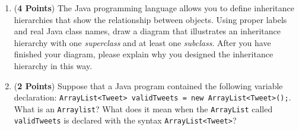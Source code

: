 \documentclass[12pt]{article}
\begin{document}
\begin{enumerate}
\begin{enumerate}
\item ({\bf 4 Points}) The Java programming language allows you to
  define inheritance hierarchies that show the relationship between
  objects.  Using proper labels and real Java class names, draw a
  diagram that illustrates an inheritance hierarchy with one {\em
    superclass} and at least one {\em subclass}.  After you have
  finished your diagram, please explain why you designed the
  inheritance hierarchy in this way.

\item ({\bf 2 Points}) Suppose that a Java program contained the
  following variable declaration: {\tt ArrayList<Tweet> validTweets =
    new ArrayList<Tweet>();}.  What is an {\tt Arraylist}?  What does
  it mean when the {\tt ArrayList} called {\tt validTweets} is
  declared with the syntax {\tt ArrayList<Tweet>}?

\end{enumerate}


\end{enumerate}
\end{document}
